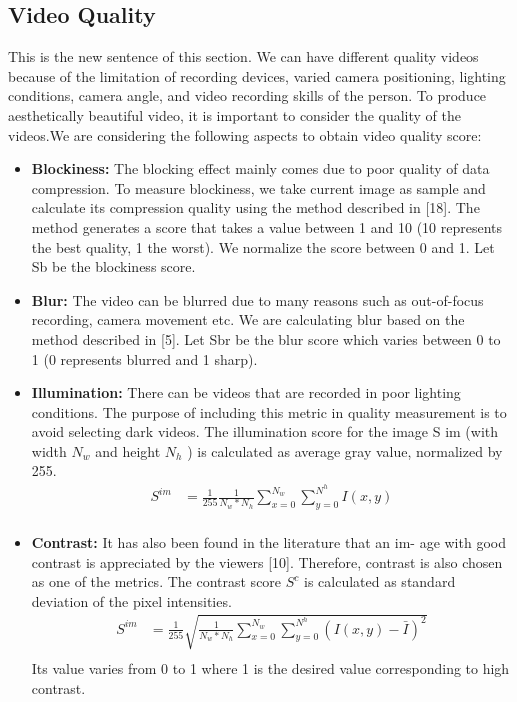 \documentclass{sig-alternate}
\begin{document}
{{{\subsection{Video Quality}
This is the new sentence of this section.
We can have different quality videos because of the limitation of
recording devices, varied camera positioning, lighting conditions,
camera angle, and video recording skills of the person. To produce
aesthetically beautiful video, it is important to consider the quality
of the videos.We are considering the following aspects to obtain
video quality score:
\begin{itemize}
    \item \textbf{Blockiness: }The blocking effect mainly comes due to poor
quality of data compression. To measure blockiness, we take
current image as sample and calculate its compression quality
using the method described in [18]. The method generates
a score that takes a value between 1 and 10 (10 represents the
best quality, 1 the worst). We normalize the score between 0
and 1. Let Sb be the blockiness score.
   \item \textbf{Blur: }The video can be blurred due to many reasons such as
out-of-focus recording, camera movement etc. We are calculating
blur based on the method described in [5]. Let Sbr
be the blur score which varies between 0 to 1 (0 represents
blurred and 1 sharp).
   \item \textbf{Illumination:} There can be videos that are recorded in poor
lighting conditions. The purpose of including this metric in
quality measurement is to avoid selecting dark videos. The
illumination score for the image S im (with width $N_w$ and
height $N_h$ ) is calculated as average gray value, normalized
by 255.
\begin{align*}
S^{im}&= \frac{1}{255}\frac{1}{N_w*N_h}\sum_{x=0}^{N_w}\sum_{y=0}^{N^h}I(x,y)\\
\end{align*}
\item \textbf{Contrast:} It has also been found in the literature that an im-
age with good contrast is appreciated by the viewers [10].
Therefore, contrast is also chosen as one of the metrics. The
contrast score $S^c$ is calculated as standard deviation of the
pixel intensities.
\begin{align*}
S^{im}&= \frac{1}{255}\sqrt{\frac{1}{N_w*N_h}\sum_{x=0}^{N_w}\sum_{y=0}^{N^h}(I(x,y)-\bar{I})^2}\\
\end{align*}
Its value varies from 0 to 1 where 1 is the desired value corresponding to high contrast.

\end{itemize}}}}
\end{document}
